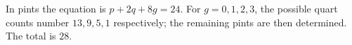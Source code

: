 In pints the equation is $p+2q+8g=24$. For $g=0,1,2,3$, the possible quart counts number $13,9,5,1$ respectively; the remaining pints are then determined. The total is $\boxed{28}$.
